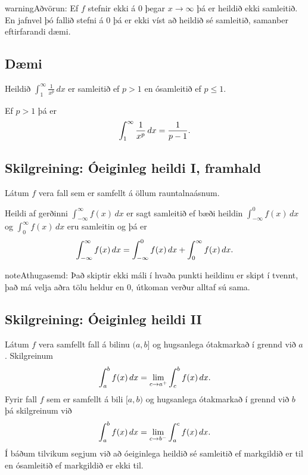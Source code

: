 \documentclass[a4paper,10pt,icelandic]{sphinxmanual}
\begin{document}
\begin{notice}{warning}{Aðvörun:}
Ef \(f\) stefnir ekki á 0 þegar \(x\to \infty\) þá
er heildið ekki samleitið. En jafnvel þó fallið stefni á
0 þá er ekki víst að heildið sé samleitið, samanber
eftirfarandi dæmi.
\end{notice}


\subsection{Dæmi}
\label{kafli06:daemi}
Heildið \(\int_1^\infty \frac{1}{x^p}\,dx\) er samleitið ef
\(p>1\) en ósamleitið ef \(p\leq 1\).

Ef \(p>1\) þá er
\begin{gather}
\begin{split}\int_1^\infty \frac{1}{x^p}\,dx=\frac{1}{p-1}.\end{split}\notag
\end{gather}

\subsection{Skilgreining: Óeiginleg heildi I, framhald}
\label{kafli06:skilgreining-oeiginleg-heildi-i-framhald}
Látum \(f\) vera fall sem er samfellt á öllum rauntalnaásnum.

Heildi af gerðinni \(\int_{-\infty}^\infty f(x)\,dx\) er sagt
samleitið ef bæði heildin \(\int_{-\infty}^0 f(x)\,dx\) og
\(\int_0^\infty f(x)\,dx\) eru samleitin og þá er
\begin{gather}
\begin{split}\int_{-\infty}^\infty f(x)\,dx=\int_{-\infty}^0 f(x)\,dx +
  \int_0^\infty f(x)\,dx.\end{split}\notag
\end{gather}
\begin{notice}{note}{Athugasemd:}
Það skiptir ekki máli í hvaða punkti heildinu er skipt í tvennt, það má
velja aðra tölu heldur en 0, útkoman verður alltaf sú sama.
\end{notice}


\subsection{Skilgreining: Óeiginleg heildi II}
\label{kafli06:skilgreining-oeiginleg-heildi-ii}
Látum \(f\) vera samfellt fall á bilinu \((a, b]\) og hugsanlega
ótakmarkað í grennd við \(a\). Skilgreinum
\begin{gather}
\begin{split}\int_a^b f(x)\,dx=\lim_{c\rightarrow a^+} \int_c^b f(x)\,dx.\end{split}\notag
\end{gather}
Fyrir fall \(f\) sem er samfellt á bili \([a, b)\) og hugsanlega
ótakmarkað í grennd við \(b\) þá skilgreinum við
\begin{gather}
\begin{split}\int_a^b f(x)\,dx=\lim_{c\rightarrow b^-} \int_a^c f(x)\,dx.\end{split}\notag
\end{gather}
Í báðum tilvikum segjum við að óeiginlega heildið sé samleitið ef
markgildið er til en ósamleitið ef markgildið er ekki til.
\end{document}
